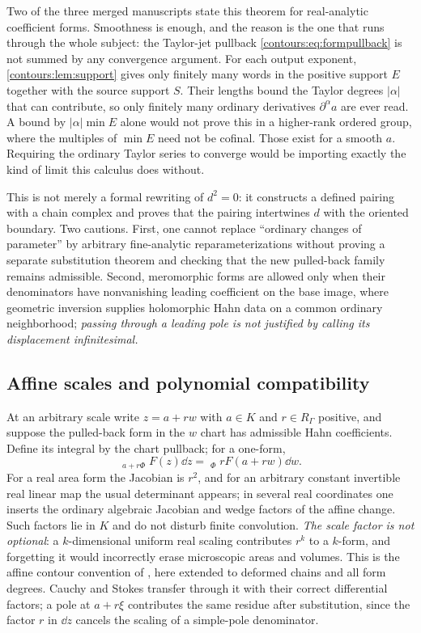 \documentclass[11pt,letterpaper]{article}
\theoremstyle{definition}
\theoremstyle{remark}
\newcommand{\HInt}{\mathop{\int^{\!H}}\nolimits}
\numberwithin{equation}{section}
\begin{document}
\begin{remark}
Two of the three merged manuscripts state this theorem for real-analytic
coefficient forms. Smoothness is enough, and the reason is the one that runs
through the whole subject: the Taylor-jet pullback
\eqref{contours:eq:formpullback} is not summed by any convergence argument.
For each output exponent, \cref{contours:lem:support} gives only finitely many
words in the positive support $E$ together with the source support $S$.
Their lengths bound the Taylor degrees $|\alpha|$ that can contribute, so only
finitely many ordinary derivatives $\partial^\alpha a$ are ever read.
A bound by $|\alpha|\min E$ alone would not prove this in a higher-rank
ordered group, where the multiples of $\min E$ need not be cofinal.
Those exist for a smooth $a$. Requiring the ordinary Taylor series to converge
would be importing exactly the kind of limit this calculus does without.
\end{remark}

This is not merely a formal rewriting of $d^2=0$: it constructs a defined pairing
with a chain complex and proves that the pairing intertwines $d$ with the oriented
boundary. Two cautions. First, one cannot replace ``ordinary changes of parameter''
by arbitrary fine-analytic reparameterizations without proving a separate
substitution theorem and checking that the new pulled-back family remains
admissible. Second, meromorphic forms are allowed only when their denominators have
nonvanishing leading coefficient on the base image, where geometric inversion
supplies holomorphic Hahn data on a common ordinary neighborhood; \emph{passing
through a leading pole is not justified by calling its displacement
infinitesimal.}

\subsection{Affine scales and polynomial compatibility}
At an arbitrary scale write $z=a+rw$ with $a\in K$ and $r\in R_\Gamma$ positive, and
suppose the pulled-back form in the $w$ chart has admissible Hahn coefficients.
Define its integral by the chart pullback; for a one-form,
\begin{equation}\label{contours:eq:affineintegral}
  \HInt_{a+r\Phi}F(z)\dd z=\HInt_\Phi rF(a+rw)\dd w .
\end{equation}
For a real area form the Jacobian is $r^2$, and for an arbitrary constant invertible
real linear map the usual determinant appears; in several real coordinates one
inserts the ordinary algebraic Jacobian and wedge factors of the affine change.
Such factors lie in $K$ and do not disturb finite convolution. \emph{The scale
factor is not optional}: a $k$-dimensional uniform real scaling contributes $r^k$
to a $k$-form, and forgetting it would incorrectly erase microscopic areas and
volumes. This is the affine contour convention of \cite{Analysis}, here extended to
deformed chains and all form degrees. Cauchy and Stokes transfer through it with
their correct differential factors; a pole at $a+r\xi$ contributes the same residue
after substitution, since the factor $r$ in $\dd z$ cancels the scaling of a simple-pole
denominator.
\end{document}
